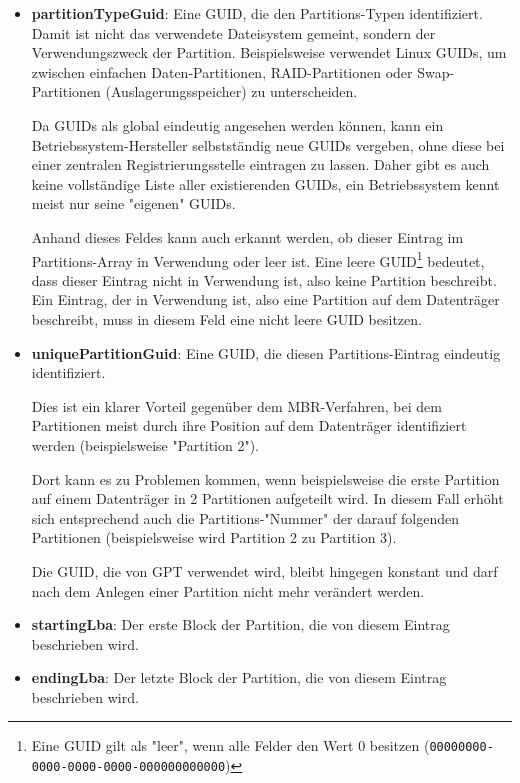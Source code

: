 \begin{itemize}
    \item \textbf{partitionTypeGuid}:
    Eine GUID, die den Partitions-Typen identifiziert.
    Damit ist nicht das verwendete Dateisystem gemeint, sondern der Verwendungszweck der Partition.
    Beispielsweise verwendet Linux GUIDs, um zwischen einfachen Daten-Partitionen, RAID-Partitionen oder Swap-Partitionen (Auslagerungsspeicher) zu unterscheiden.
    
    Da GUIDs als global eindeutig angesehen werden können, kann ein Betriebssystem-Hersteller selbstständig neue GUIDs vergeben, ohne diese bei einer zentralen Registrierungsstelle eintragen zu lassen.
    Daher gibt es auch keine vollständige Liste aller existierenden GUIDs, ein Betriebssystem kennt meist nur seine "eigenen" GUIDs.

    Anhand dieses Feldes kann auch erkannt werden, ob dieser Eintrag im Partitions-Array in Verwendung oder leer ist.
    Eine leere GUID\footnote{
        Eine GUID gilt als "leer", wenn alle Felder den Wert 0 besitzen (\texttt{00000000-0000-0000-0000-000000000000})
    } bedeutet, dass dieser Eintrag nicht in Verwendung ist, also keine Partition beschreibt.
    Ein Eintrag, der in Verwendung ist, also eine Partition auf dem Datenträger beschreibt, muss in diesem Feld eine nicht leere GUID besitzen.

    \item \textbf{uniquePartitionGuid}:
    Eine GUID, die diesen Partitions-Eintrag eindeutig identifiziert.
    
    Dies ist ein klarer Vorteil gegenüber dem MBR-Verfahren, bei dem Partitionen meist durch ihre Position auf dem Datenträger identifiziert werden (beispielsweise "Partition 2").
    
    Dort kann es zu Problemen kommen, wenn beispielsweise die erste Partition auf einem Datenträger in 2 Partitionen aufgeteilt wird.
    In diesem Fall erhöht sich entsprechend auch die Partitions-"Nummer" der darauf folgenden Partitionen (beispielsweise wird Partition 2 zu Partition 3).
    
    Die GUID, die von GPT verwendet wird, bleibt hingegen konstant und darf nach dem Anlegen einer Partition nicht mehr verändert werden.

    \item \textbf{startingLba}:
    Der erste Block der Partition, die von diesem Eintrag beschrieben wird.

    \item \textbf{endingLba}:
    Der letzte Block der Partition, die von diesem Eintrag beschrieben wird.


\end{itemize}
